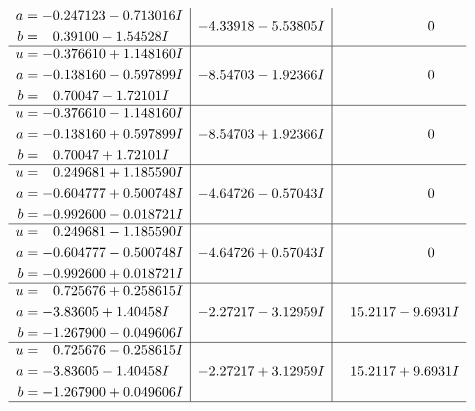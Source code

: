 \documentclass[1p]{elsarticle_modified}
\theoremstyle{definition}
\begin{document}
$$\begin{array}{c|c|c}
\begin{aligned}
a &= -0.247123 - 0.713016 I \\
b &= \phantom{-}0.39100 - 1.54528 I\end{aligned}
 & -4.33918 - 5.53805 I & \phantom{-0.000000 } 0 \\ \hline\begin{aligned}
u &= -0.376610 + 1.148160 I \\
a &= -0.138160 - 0.597899 I \\
b &= \phantom{-}0.70047 - 1.72101 I\end{aligned}
 & -8.54703 - 1.92366 I & \phantom{-0.000000 } 0 \\ \hline\begin{aligned}
u &= -0.376610 - 1.148160 I \\
a &= -0.138160 + 0.597899 I \\
b &= \phantom{-}0.70047 + 1.72101 I\end{aligned}
 & -8.54703 + 1.92366 I & \phantom{-0.000000 } 0 \\ \hline\begin{aligned}
u &= \phantom{-}0.249681 + 1.185590 I \\
a &= -0.604777 + 0.500748 I \\
b &= -0.992600 - 0.018721 I\end{aligned}
 & -4.64726 - 0.57043 I & \phantom{-0.000000 } 0 \\ \hline\begin{aligned}
u &= \phantom{-}0.249681 - 1.185590 I \\
a &= -0.604777 - 0.500748 I \\
b &= -0.992600 + 0.018721 I\end{aligned}
 & -4.64726 + 0.57043 I & \phantom{-0.000000 } 0 \\ \hline\begin{aligned}
u &= \phantom{-}0.725676 + 0.258615 I \\
a &= -3.83605 + 1.40458 I \\
b &= -1.267900 - 0.049606 I\end{aligned}
 & -2.27217 - 3.12959 I & \phantom{-}15.2117 - 9.6931 I \\ \hline\begin{aligned}
u &= \phantom{-}0.725676 - 0.258615 I \\
a &= -3.83605 - 1.40458 I \\
b &= -1.267900 + 0.049606 I\end{aligned}
 & -2.27217 + 3.12959 I & \phantom{-}15.2117 + 9.6931 I\\
 \hline 
 \end{array}$$\newpage$$\begin{array}{c|c|c}  

\end{array}$$
\end{document}
